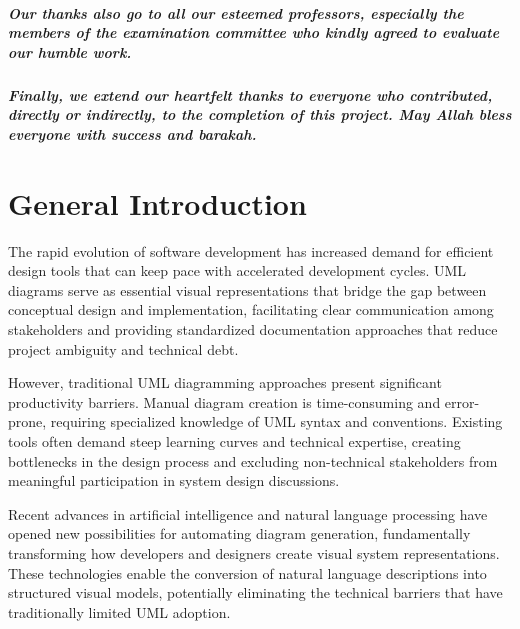 \documentclass[a4paper,12pt]{report}
\begin{document}
\paragraph{Our thanks also go to all our esteemed professors, especially the members of the examination committee who kindly agreed to evaluate our humble work.}

\paragraph{Finally, we extend our heartfelt thanks to everyone who contributed, directly or indirectly, to the completion of this project. May Allah bless everyone with success and barakah.}

\newpage

\tableofcontents
\newpage

\listoffigures
\newpage

\listoftables
\newpage
\chapter{General Introduction}
\label{chap:general_introduction}

The rapid evolution of software development has increased demand for efficient design tools that can keep pace with accelerated development cycles. UML diagrams serve as essential visual representations that bridge the gap between conceptual design and implementation, facilitating clear communication among stakeholders and providing standardized documentation approaches that reduce project ambiguity and technical debt.

However, traditional UML diagramming approaches present significant productivity barriers. Manual diagram creation is time-consuming and error-prone, requiring specialized knowledge of UML syntax and conventions. Existing tools often demand steep learning curves and technical expertise, creating bottlenecks in the design process and excluding non-technical stakeholders from meaningful participation in system design discussions.

Recent advances in artificial intelligence and natural language processing have opened new possibilities for automating diagram generation, fundamentally transforming how developers and designers create visual system representations. These technologies enable the conversion of natural language descriptions into structured visual models, potentially eliminating the technical barriers that have traditionally limited UML adoption.
\end{document}
